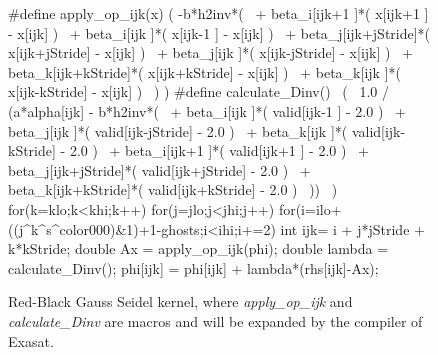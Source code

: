 \documentclass{article}
\begin{document}
\begin{figure}[htp]
\begin{boxedverbatim}
      #define apply_op_ijk(x) 
      (
        -b*h2inv*(                                           \
          + beta_i[ijk+1      ]*( x[ijk+1      ] - x[ijk] )  \
          + beta_i[ijk        ]*( x[ijk-1      ] - x[ijk] )  \
          + beta_j[ijk+jStride]*( x[ijk+jStride] - x[ijk] )  \
          + beta_j[ijk        ]*( x[ijk-jStride] - x[ijk] )  \
          + beta_k[ijk+kStride]*( x[ijk+kStride] - x[ijk] )  \
          + beta_k[ijk        ]*( x[ijk-kStride] - x[ijk] )  \
        )
      )       
      #define calculate_Dinv()                               \
      (                                                      \
        1.0 / (a*alpha[ijk] - b*h2inv*(                      \
          + beta_i[ijk        ]*( valid[ijk-1      ] - 2.0 ) \
          + beta_j[ijk        ]*( valid[ijk-jStride] - 2.0 ) \
          + beta_k[ijk        ]*( valid[ijk-kStride] - 2.0 ) \
          + beta_i[ijk+1      ]*( valid[ijk+1      ] - 2.0 ) \
          + beta_j[ijk+jStride]*( valid[ijk+jStride] - 2.0 ) \
          + beta_k[ijk+kStride]*( valid[ijk+kStride] - 2.0 ) \
        ))                                                   \
      )
      for(k=klo;k<khi;k++){
        for(j=jlo;j<jhi;j++){
          for(i=ilo+((j^k^s^color000)&1)+1-ghosts;i<ihi;i+=2){ 
            int ijk=  i + j*jStride + k*kStride;
            double Ax     = apply_op_ijk(phi);
            double lambda = calculate_Dinv();
            phi[ijk] = phi[ijk] + lambda*(rhs[ijk]-Ax);
      }}}
\end{boxedverbatim}
\caption{Red-Black Gauss Seidel kernel, where {\em apply\_op\_ijk} and {\em calculate\_Dinv} are macros and will be expanded by the compiler of Exasat.}
\label{redblack}
\end{figure}
\end{document}
